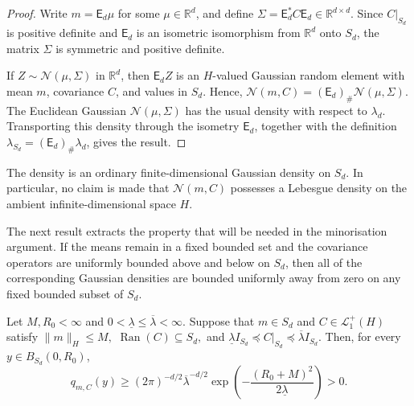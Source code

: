 \begin{proof}
Write \(m=\mathsf E_d\mu\) for some \(\mu\in\mathbb R^d\), and define
\(
\Sigma=\mathsf E_d^*C\mathsf E_d\in\mathbb R^{d\times d}.
\)
Since \(C|_{S_d}\) is positive definite and \(\mathsf E_d\) is an isometric isomorphism from \(\mathbb R^d\) onto \(S_d\), the matrix \(\Sigma\) is symmetric and positive definite.

If \(Z\sim\mathcal N(\mu,\Sigma)\) in \(\mathbb R^d\), then \(\mathsf E_dZ\) is an \(H\)-valued Gaussian random element with mean \(m\), covariance \(C\), and values in \(S_d\). Hence, \(
\mathcal N(m,C)
=
(\mathsf E_d)_\#
\mathcal N(\mu,\Sigma).
\)
The Euclidean Gaussian \(\mathcal N(\mu,\Sigma)\) has the usual density with respect to \(\lambda_d\). Transporting this density through the isometry \(\mathsf E_d\), together with the definition \(\lambda_{S_d}=(\mathsf E_d)_\#\lambda_d\), gives the result.
\end{proof}

The density is an ordinary finite-dimensional Gaussian density on \(S_d\). In particular, no claim is made that \(\mathcal N(m,C)\) possesses a Lebesgue density on the ambient infinite-dimensional space \(H\).

The next result extracts the property that will be needed in the minorisation argument. If the means remain in a fixed bounded set and the covariance operators are uniformly bounded above and below on \(S_d\), then all of the corresponding Gaussian densities are bounded uniformly away from zero on any fixed bounded subset of \(S_d\).

\begin{lemma}[]
\label{lem:Uniform lower bound for Gaussian densities on a fixed ball}
Let \(M,R_0<\infty\) and \(0<\underline\lambda\leqslant\overline\lambda<\infty\). Suppose that \(m\in S_d\) and \(C\in\mathcal L_1^+(H)\) satisfy
\(
\|m\|_H\leqslant M,
\)
\(
\operatorname{Ran}(C)\subseteq S_d,
\)
and
\(
\underline\lambda I_{S_d}
\preceq
C|_{S_d}
\preceq
\overline\lambda I_{S_d}.
\)
Then, for every \(y\in B_{S_d}(0,R_0)\),
\[
q_{m,C}(y)
\geqslant
(2\pi)^{-d/2}
\overline\lambda^{-d/2}
\exp\left(
-\frac{(R_0+M)^2}{2\underline\lambda}
\right)
>0.
\]
\end{lemma}

